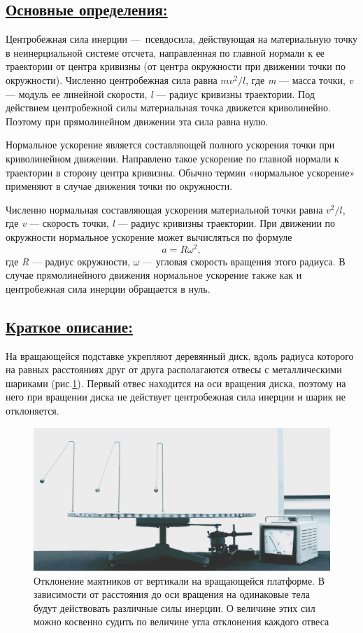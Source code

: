 \documentclass[14pt,a4paper,oneside]{extarticle}	%
\begin{document}
	\subsection*{\underline{Основные определения:}}
		
		Центробежная сила инерции — псевдосила, действующая на материальную точку в неинерциальной системе отсчета, 
		направленная по главной нормали к ее траектории от центра кривизны 
		(от центра окружности при движении точки по окружности).
		Численно центробежная сила равна $ mv^2/l $, где \textit{m} — масса точки, \textit{v} — модуль ее линейной скорости, \textit{l} — радиус кривизны траектории.
		Под действием центробежной силы материальная точка движется криволинейно. 
		Поэтому при прямолинейном движении эта сила равна нулю.
		
		Нормальное ускорение является составляющей полного ускорения точки при криволинейном движении.
		Направлено такое ускорение по главной нормали к траектории в сторону центра кривизны.
		Обычно термин «нормальное ускорение» применяют в случае движения точки по окружности.
		
		Численно нормальная составляющая ускорения материальной точки равна $ v^2/l $, где \textit{v} — скорость точки, \textit{l} — радиус кривизны траектории.
		При движении по окружности нормальное ускорение может вычисляться по формуле $$ a = R\omega^2, $$ где \textit{R} — радиус окружности, $ \omega $ — угловая скорость вращения этого радиуса. 
		В случае прямолинейного движения нормальное ускорение также как и центробежная сила инерции обращается в нуль.

\subsection*{\underline{Краткое описание:}}
			
На вращающейся подставке укрепляют деревянный диск, вдоль радиуса которого на равных расстояниях друг от друга располагаются отвесы с металлическими шариками (рис.\ref{platform-2}).
Первый отвес находится на оси вращения диска, поэтому на него при вращении диска не действует центробежная сила инерции и шарик не отклоняется.

\begin{figure}[H] 
	\centering 		
	\includegraphics[width=0.8\linewidth]{platform-2.png} 
	\caption{Отклонение маятников от вертикали на вращающейся платформе. В зависимости от расстояния до оси вращения на одинаковые тела будут действовать различные силы инерции. О величине этих сил можно косвенно судить по величине угла отклонения каждого отвеса}
	\label{platform-2}
\end{figure}
	
\end{document}
